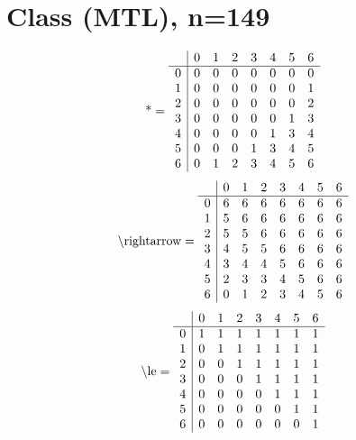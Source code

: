 \documentclass[11pt]{article}
\begin{document}
\section{Class (MTL), n=149}
\[\text{*} = 
\begin{array}{r | r r r r r r r}
 & 0 & 1 & 2 & 3 & 4 & 5 & 6 \\ \hline
0 & 0 & 0 & 0 & 0 & 0 & 0 & 0 \\
1 & 0 & 0 & 0 & 0 & 0 & 0 & 1 \\
2 & 0 & 0 & 0 & 0 & 0 & 0 & 2 \\
3 & 0 & 0 & 0 & 0 & 0 & 1 & 3 \\
4 & 0 & 0 & 0 & 0 & 1 & 3 & 4 \\
5 & 0 & 0 & 0 & 1 & 3 & 4 & 5 \\
6 & 0 & 1 & 2 & 3 & 4 & 5 & 6 \\
\end{array}
\]
\[\text{\textbackslash rightarrow} = 
\begin{array}{r | r r r r r r r}
 & 0 & 1 & 2 & 3 & 4 & 5 & 6 \\ \hline
0 & 6 & 6 & 6 & 6 & 6 & 6 & 6 \\
1 & 5 & 6 & 6 & 6 & 6 & 6 & 6 \\
2 & 5 & 5 & 6 & 6 & 6 & 6 & 6 \\
3 & 4 & 5 & 5 & 6 & 6 & 6 & 6 \\
4 & 3 & 4 & 4 & 5 & 6 & 6 & 6 \\
5 & 2 & 3 & 3 & 4 & 5 & 6 & 6 \\
6 & 0 & 1 & 2 & 3 & 4 & 5 & 6 \\
\end{array}
\]
\[\text{\textbackslash le} = 
\begin{array}{r | r r r r r r r}
 & 0 & 1 & 2 & 3 & 4 & 5 & 6 \\ \hline
0 & 1 & 1 & 1 & 1 & 1 & 1 & 1 \\
1 & 0 & 1 & 1 & 1 & 1 & 1 & 1 \\
2 & 0 & 0 & 1 & 1 & 1 & 1 & 1 \\
3 & 0 & 0 & 0 & 1 & 1 & 1 & 1 \\
4 & 0 & 0 & 0 & 0 & 1 & 1 & 1 \\
5 & 0 & 0 & 0 & 0 & 0 & 1 & 1 \\
6 & 0 & 0 & 0 & 0 & 0 & 0 & 1 \\
\end{array}
\]
\end{document}
